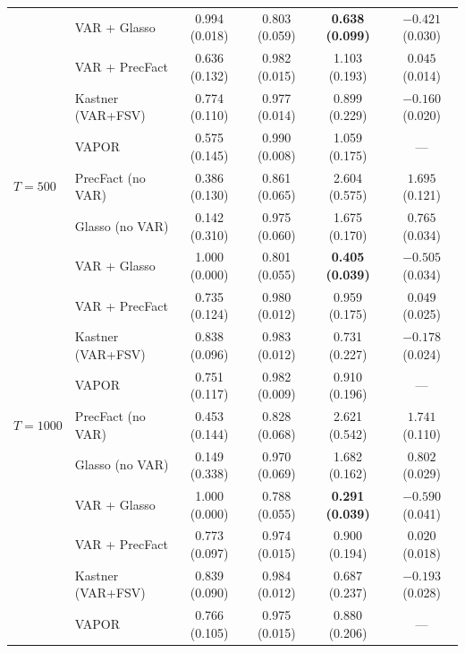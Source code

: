\begin{table}[h!]
\begin{tabular}{llcccc}
           & VAR + Glasso       & 0.994 (0.018) & 0.803 (0.059) & \textbf{0.638 (0.099)} & $-0.421$ (0.030) \\
           & VAR + PrecFact     & 0.636 (0.132) & 0.982 (0.015) & 1.103 (0.193) & $0.045$ (0.014) \\
           & Kastner (VAR+FSV)  & 0.774 (0.110) & 0.977 (0.014) & 0.899 (0.229) & $-0.160$ (0.020) \\
           & VAPOR              & 0.575 (0.145) & 0.990 (0.008) & 1.059 (0.175) & --- \\
\midrule
$T = 500$  & PrecFact (no VAR)  & 0.386 (0.130) & 0.861 (0.065) & 2.604 (0.575) & $1.695$ (0.121) \\
           & Glasso (no VAR)    & 0.142 (0.310) & 0.975 (0.060) & 1.675 (0.170) & $0.765$ (0.034) \\
           & VAR + Glasso       & 1.000 (0.000) & 0.801 (0.055) & \textbf{0.405 (0.039)} & $-0.505$ (0.034) \\
           & VAR + PrecFact     & 0.735 (0.124) & 0.980 (0.012) & 0.959 (0.175) & $0.049$ (0.025) \\
           & Kastner (VAR+FSV)  & 0.838 (0.096) & 0.983 (0.012) & 0.731 (0.227) & $-0.178$ (0.024) \\
           & VAPOR              & 0.751 (0.117) & 0.982 (0.009) & 0.910 (0.196) & --- \\
\midrule
$T = 1000$ & PrecFact (no VAR)  & 0.453 (0.144) & 0.828 (0.068) & 2.621 (0.542) & $1.741$ (0.110) \\
           & Glasso (no VAR)    & 0.149 (0.338) & 0.970 (0.069) & 1.682 (0.162) & $0.802$ (0.029) \\
           & VAR + Glasso       & 1.000 (0.000) & 0.788 (0.055) & \textbf{0.291 (0.039)} & $-0.590$ (0.041) \\
           & VAR + PrecFact     & 0.773 (0.097) & 0.974 (0.015) & 0.900 (0.194) & $0.020$ (0.018) \\
           & Kastner (VAR+FSV)  & 0.839 (0.090) & 0.984 (0.012) & 0.687 (0.237) & $-0.193$ (0.028) \\
           & VAPOR              & 0.766 (0.105) & 0.975 (0.015) & 0.880 (0.206) & --- \\
\bottomrule
\end{tabular}
\end{table}

